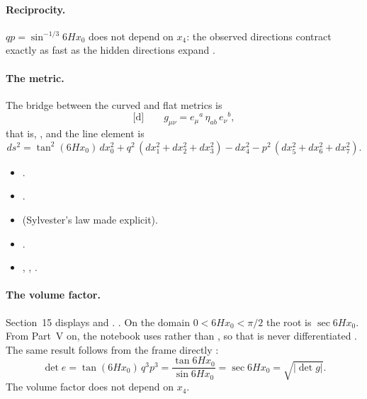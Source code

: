 \paragraph{Reciprocity.} $qp=\sin^{-1/3}6Hx_0$ does not depend on $x_4$: the observed directions
contract exactly as fast as the hidden directions expand .

\paragraph{The metric.} The bridge between the curved and flat metrics is
\begin{equation}
  \text{[d]}\qquad g_{\mu\nu}=e_\mu{}^a\,\eta_{ab}\,e_\nu{}^b ,
\end{equation}
that is, , and the line
element is
\begin{equation}
  ds^2=\tan^2(6Hx_0)\,dx_0^2+q^2\,(dx_1^2+dx_2^2+dx_3^2)-dx_4^2-p^2\,(dx_5^2+dx_6^2+dx_7^2).
\end{equation}
\begin{itemize}
  \item {} .
  \item {} .
  \item {}  (Sylvester's law made explicit).
  \item {} .
  \item {} , , .
\end{itemize}

\paragraph{The volume factor.} Section~15 displays  and
 . 
. On the domain
$0<6Hx_0<\pi/2$ the root is $\sec 6Hx_0$. From Part~V on, the notebook uses
 rather than , so that  is
never differentiated . The same result follows from the frame directly
\cfderived:
\begin{equation}
  \det e=\tan(6Hx_0)\,q^3p^3=\frac{\tan 6Hx_0}{\sin 6Hx_0}=\sec 6Hx_0=\sqrt{|\det g|}.
\end{equation}
The volume factor does not depend on $x_4$.

